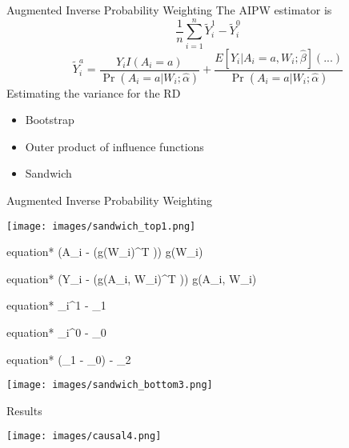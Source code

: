 \documentclass{beamer}
\begin{document}
\begin{frame}{Augmented Inverse Probability Weighting}
	The AIPW estimator is
	\[\frac{1}{n} \sum_{i=1}^n \tilde{Y}_i^1 - \tilde{Y}_i^0\]
	\[\tilde{Y}^a_i = \frac{Y_i I(A_i = a)}{\Pr(A_i = a | W_i; \hat{\alpha})} + \frac{E[Y_i | A_i=a,W_i; \hat{\beta}] ( ...)}{\Pr(A_i = a | W_i; \hat{\alpha})}\]
	Estimating the variance for the RD
	\begin{itemize}
		\item Bootstrap
		\item Outer product of influence functions
		\item Sandwich
	\end{itemize}
\end{frame}

\begin{frame}{Augmented Inverse Probability Weighting}
	\begin{center}
		\texttt{[image: images/sandwich\_top1.png]}
		\begin{empheq}[box=\bbox]{equation*}
			\left(A_i - (g(W_i)^T \hat{\alpha})\right) g(W_i)
		\end{empheq}
		\begin{empheq}[box=\rbox]{equation*}
			\left(Y_i - (g(A_i, W_i)^T \hat{\beta})\right) g(A_i, W_i)
		\end{empheq}
		\begin{empheq}[box=\wbox]{equation*}
			_i^1 - \hat{\mu}_1
		\end{empheq}
		\begin{empheq}[box=\wbox]{equation*}
			_i^0 - \hat{\mu}_0
		\end{empheq}
		\begin{empheq}[box=\wbox]{equation*}
			(\hat{\mu}_1 - \hat{\mu}_0) - \hat{\mu}_2
		\end{empheq}
		\texttt{[image: images/sandwich\_bottom3.png]}
	\end{center}
\end{frame}

\begin{frame}{Results}
	\begin{center}
		\texttt{[image: images/causal4.png]}
	\end{center}
\end{frame}
\end{document}
